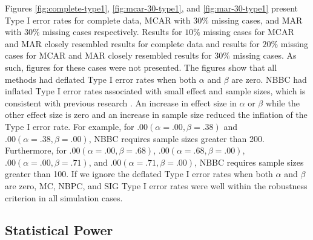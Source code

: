\documentclass[man]{apa7}\usepackage[]{graphicx}\usepackage[]{xcolor}
\begin{document}
Figures
\ref{fig:complete-type1},
\ref{fig:mcar-30-type1},
and
\ref{fig:mar-30-type1}
present Type I error rates
for complete data,
MCAR with $30\%$ missing cases,
and MAR with $30\%$ missing cases
respectively.
Results for $10\%$ missing cases for MCAR and MAR closely resembled
results for complete data and
results for $20\%$ missing cases for MCAR and MAR closely resembled
results for $30\%$ missing cases.
As such,
figures for these cases were not presented.
The figures show that all methods had deflated Type I error rates when both ${\alpha}$ and ${\beta}$ are zero.
NBBC had inflated Type I error rates associated with small effect and sample sizes,
which is consistent with previous research
\parencite[e.g.,][]{Lib-Mediation-Monte-Carlo-Method-MacKinnon-2004,
	Lib-Mediation-Bootstrap-Biesanz-2010,
	Lib-Mediation-Bootstrap-Hayes-2013,
Lib-Mediation-Bootstrap-Tofighi-2020}.
An increase in effect size in ${\alpha}$ or ${\beta}$ while the other effect size is zero and an increase in sample size reduced the inflation of the Type I error rate.
For example,
for $.00 \left( \alpha = .00, \beta = .38 \right)$ and $.00 \left( \alpha = .38, \beta = .00 \right)$,
NBBC requires sample sizes greater than 200.
Furthermore,
for $.00 \left( \alpha = .00, \beta = .68 \right)$,
$.00 \left( \alpha = .68, \beta = .00 \right)$,
$.00 \left( \alpha = .00, \beta = .71 \right)$, and
$.00 \left( \alpha = .71, \beta = .00 \right)$,
NBBC requires sample sizes greater than 100.
If we ignore the deflated Type I error rates when both ${\alpha}$ and ${\beta}$ are zero,
MC,
NBPC,
and SIG Type I error rates were well within the robustness criterion in all simulation cases.

\subsection{Statistical Power}
\end{document}

